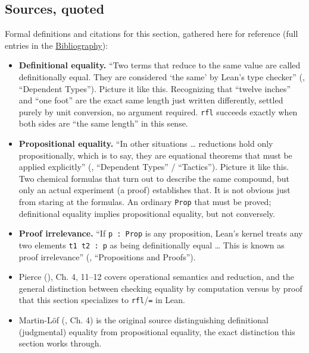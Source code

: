 \subsection{Sources, quoted}\label{sec:06-rigor-check:04-defeq-vs-propeq:7}

Formal definitions and citations for this section, gathered here for reference (full entries in the \hyperref[sec:root:bibliography:1]{Bibliography}):

\begin{itemize}
\tightlist
\item
  \textbf{Definitional equality.} ``Two terms that reduce to the same value are called definitionally equal. They are considered `the same' by Lean's type checker'' (\cite{TPIL4}, ``Dependent Types''). Picture it like this. Recognizing that ``twelve inches'' and ``one foot'' are the exact same length just written differently, settled purely by unit conversion, no argument required. \texttt{rfl} succeeds exactly when both sides are ``the same length'' in this sense.
\item
  \textbf{Propositional equality.} ``In other situations \ldots{} reductions hold only propositionally, which is to say, they are equational theorems that must be applied explicitly'' (\cite{TPIL4}, ``Dependent Types'' / ``Tactics''). Picture it like this. Two chemical formulas that turn out to describe the same compound, but only an actual experiment (a proof) establishes that. It is not obvious just from staring at the formulas. An ordinary \texttt{Prop} that must be proved; definitional equality implies propositional equality, but not conversely.
\item
  \textbf{Proof irrelevance.} ``If \texttt{p : Prop} is any proposition, Lean's kernel treats any two elements \texttt{t1 t2 : p} as being definitionally equal \ldots{} This is known as proof irrelevance'' (\cite{TPIL4}, ``Propositions and Proofs'').
\item
  Pierce (\cite{Pierce2002}), Ch. 4, 11--12 covers operational semantics and reduction, and the general distinction between checking equality by computation versus by proof that this section specializes to \texttt{rfl}/\texttt{=} in Lean.
\item
  Martin-Löf (\cite{MartinLof1984}, Ch. 4) is the original source distinguishing definitional (judgmental) equality from propositional equality, the exact distinction this section works through.
\end{itemize}
